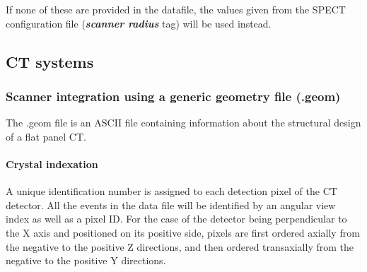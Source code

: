 \documentclass[a4paper, 11pt]{article}
\begin{document}
If none of these are provided in the datafile, the values given from the SPECT configuration file (\textbf{\textit{scanner radius}} tag)
will be used instead.


\subsection{CT systems}
\label{ss_scanner_integration_CT}

\subsubsection{Scanner integration using a generic geometry file (.geom)}
\label{sss_scanner_integration_CT_geom}

The .geom file is an ASCII file containing information about the structural design of a flat panel CT.

\paragraph{Crystal indexation} 
A unique identification number is assigned to each detection pixel of the CT detector.
All the events in the data file will be identified by an angular view index as well as a pixel ID.
For the case of the detector being perpendicular to the X axis and positioned on its positive side, pixels are first ordered axially from the negative to the positive Z directions, and then ordered transaxially from the negative to the positive Y directions.
\end{document}
